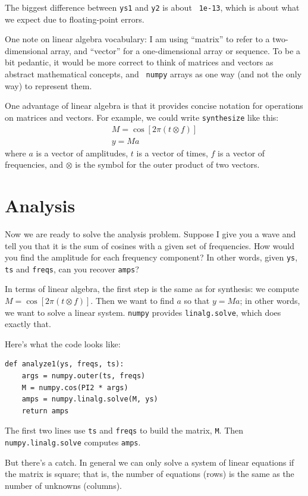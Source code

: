 \documentclass[12pt]{book}
\begin{document}
The biggest difference between {\tt ys1} and {\tt y2} is about {\tt
  1e-13}, which is about what we expect due to floating-point errors.

One note on linear algebra vocabulary: I am using ``matrix'' to refer
to a two-dimensional array, and ``vector'' for a one-dimensional array
or sequence.  To be a bit pedantic, it would be more correct to think
of matrices and vectors as abstract mathematical concepts, and {\tt
  numpy} arrays as one way (and not the only way) to represent them.

One advantage of linear algebra is that it provides concise notation
for operations on matrices and vectors.  For example, we could write
{\tt synthesize} like this:
%
\begin{eqnarray*}
M = \cos [2 \pi (t \otimes f)] \\
y = M a
\end{eqnarray*}
%
where $a$ is a vector of amplitudes,
$t$ is a vector of times, $f$ is a vector of frequencies, and
$\otimes$ is the symbol for the outer product of two vectors.


\section{Analysis}

Now we are ready to solve the analysis problem.  Suppose I give you
a wave and tell you that it is the sum of cosines with a given set
of frequencies.  How would you find the amplitude for each frequency
component?  In other words, given {\tt ys}, {\tt ts} and {\tt freqs},
can you recover {\tt amps}?

In terms of linear algebra, the first step is the same as for
synthesis: we compute $M = \cos[2 \pi (t \otimes f)]$.  Then we want
to find $a$ so that $y = M a$; in other words, we want to solve a
linear system.  {\tt numpy} provides {\tt linalg.solve}, which does
exactly that.

Here's what the code looks like:

\begin{verbatim}
def analyze1(ys, freqs, ts):
    args = numpy.outer(ts, freqs)
    M = numpy.cos(PI2 * args)
    amps = numpy.linalg.solve(M, ys)
    return amps
\end{verbatim}

The first two lines use {\tt ts} and {\tt freqs} to build the
matrix, {\tt M}.  Then {\tt numpy.linalg.solve} computes {\tt amps}.

But there's a catch.  In general we can only solve a system of linear
equations if the matrix is square; that is, the number of equations
(rows) is the same as the number of unknowns (columns).
\end{document}
